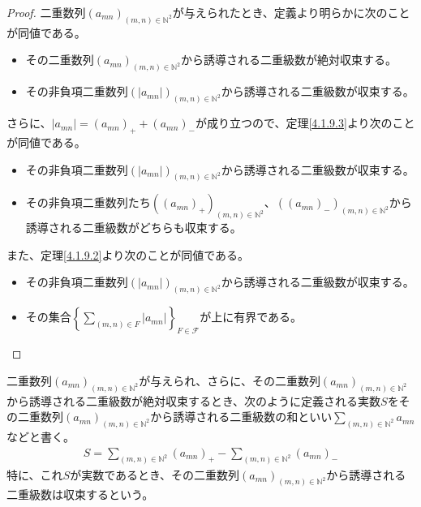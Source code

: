 \documentclass[dvipdfmx]{jsarticle}
\begin{document}
\begin{proof}
二重数列$\left( a_{mn} \right)_{(m,n) \in \mathbb{N}^{2}}$が与えられたとき、定義より明らかに次のことが同値である。
\begin{itemize}
\item
  その二重数列$\left( a_{mn} \right)_{(m,n) \in \mathbb{N}^{2}}$から誘導される二重級数が絶対収束する。
\item
  その非負項二重数列$\left( \left| a_{mn} \right| \right)_{(m,n) \in \mathbb{N}^{2}}$から誘導される二重級数が収束する。
\end{itemize}
さらに、$\left| a_{mn} \right| = \left( a_{mn} \right)_{+} + \left( a_{mn} \right)_{-}$が成り立つので、定理\ref{4.1.9.3}より次のことが同値である。
\begin{itemize}
\item
  その非負項二重数列$\left( \left| a_{mn} \right| \right)_{(m,n) \in \mathbb{N}^{2}}$から誘導される二重級数が収束する。
\item
  その非負項二重数列たち$\left( \left( a_{mn} \right)_{+} \right)_{(m,n) \in \mathbb{N}^{2}}$、$\left( \left( a_{mn} \right)_{-} \right)_{(m,n) \in \mathbb{N}^{2}}$から誘導される二重級数がどちらも収束する。
\end{itemize}
また、定理\ref{4.1.9.2}より次のことが同値である。
\begin{itemize}
\item
  その非負項二重数列$\left( \left| a_{mn} \right| \right)_{(m,n) \in \mathbb{N}^{2}}$から誘導される二重級数が収束する。
\item
  その集合$\left\{ \sum_{(m,n) \in F}\left| a_{mn} \right| \right\}_{F\in \mathcal{F}}$が上に有界である。
\end{itemize}
\end{proof}
\begin{dfn}
二重数列$\left( a_{mn} \right)_{(m,n) \in \mathbb{N}^{2}}$が与えられ、さらに、その二重数列$\left( a_{mn} \right)_{(m,n) \in \mathbb{N}^{2}}$から誘導される二重級数が絶対収束するとき、次のように定義される実数$S$をその二重数列$\left( a_{mn} \right)_{(m,n) \in \mathbb{N}^{2}}$から誘導される二重級数の和といい$\sum_{(m,n) \in \mathbb{N}^{2}}a_{mn}$などと書く。
\begin{align*}
S = \sum_{(m,n) \in \mathbb{N}^{2}}\left( a_{mn} \right)_{+} - \sum_{(m,n) \in \mathbb{N}^{2}}\left( a_{mn} \right)_{-}
\end{align*}
特に、これ$S$が実数であるとき、その二重数列$\left( a_{mn} \right)_{(m,n) \in \mathbb{N}^{2}}$から誘導される二重級数は収束するという。
\end{dfn}
\end{document}
